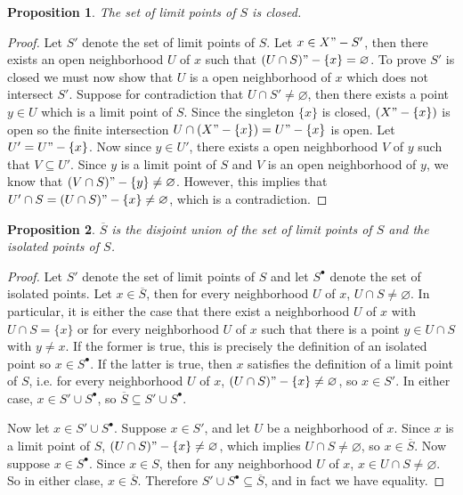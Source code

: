 \documentclass[12pt]{article}
\newtheorem{proposition}{Proposition}
\newcommand{\clo}[1]{\overline{#1}}
\let\emptyset\varnothing
\begin{document}
\begin{proposition}
    The set of limit points of $S$ is closed.
\end{proposition}

\begin{proof}
    Let $S'$ denote the set of limit points of $S$. Let $x\in X"-S'$, then there exists an open neighborhood $U$ of $x$ such that $(U\cap S)"-\{x\} = \emptyset$. To prove $S'$ is closed we must now show that $U$ is a open neighborhood of $x$ which does not intersect $S'$. Suppose for contradiction that $U\cap S'\ne\emptyset$, then there exists a point $y\in U$ which is a limit point of $S$. Since the singleton $\{x\}$ is closed, $(X"-\{x\})$ is open so the finite intersection $U\cap(X"-\{x\})=U"-\{x\}$ is open. Let $U'=U"-\{x\}$. Now since $y\in U'$, there exists a open neighborhood $V$ of $y$ such that $V\subseteq U'$. Since $y$ is a limit point of $S$ and $V$ is an open neighborhood of $y$, we know that $(V\cap S)"-\{y\}\ne\emptyset$. However, this implies that $U'\cap S = (U\cap S)"-\{x\}\ne\emptyset$, which is a contradiction.
    
\end{proof}

\begin{proposition}
    $\clo{S}$ is the disjoint union of the set of limit points of $S$ and the isolated points of $S$.
\end{proposition}

\begin{proof}
    Let $S'$ denote the set of limit points of $S$ and let $S^\bullet$ denote the set of isolated points. Let $x\in \clo{S}$, then for every neighborhood $U$ of $x$, $U\cap S\ne \emptyset$. In particular, it is either the case that there exist a neighborhood $U$ of $x$ with $U\cap S=\{x\}$ or for every neighborhood $U$ of $x$ such that there is a point $y\in U\cap S$ with $y\ne x$. If the former is true, this is precisely the definition of an isolated point so $x\in S^\bullet$. If the latter is true, then $x$ satisfies the definition of a limit point of $S$, i.e. for every neighborhood $U$ of $x$, $(U\cap S)"-\{x\}\ne\emptyset$, so $x\in S'$. In either case, $x\in S'\cup S^\bullet$, so $\clo{S}\subseteq S'\cup S^\bullet$.
    
    Now let $x\in S' \cup S^\bullet$. Suppose $x\in S'$, and let $U$ be a neighborhood of $x$. Since $x$ is a limit point of $S$, $(U\cap S)"-\{x\}\ne\emptyset$, which implies $U\cap S\ne\emptyset$, so $x\in\clo{S}$. Now suppose $x\in S^\bullet$. Since $x\in S$, then for any neighborhood $U$ of $x$, $x\in U\cap S \ne\emptyset$. So in either clase, $x\in\clo{S}$. Therefore $S'\cup S^\bullet \subseteq \clo{S}$, and in fact we have equality.
    
\end{proof}
\end{document}
